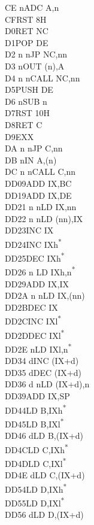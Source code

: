 \documentclass[oneside,a4paper]{book}
\begin{document}
\begin{multicols}{3}
{\begin{tabbing}
CE n\>ADC A,n\\
CF\>RST 8H\\
D0\>RET NC\\
D1\>POP DE\\
D2 n n\>JP NC,nn\\
D3 n\>OUT (n),A\\
D4 n n\>CALL NC,nn\\
D5\>PUSH DE\\
D6 n\>SUB n\\
D7\>RST 10H\\
D8\>RET C\\
D9\>EXX\\
DA n n\>JP C,nn\\
DB n\>IN A,(n)\\
DC n n\>CALL C,nn\\
DD09\>ADD IX,BC\\
DD19\>ADD IX,DE\\
DD21 n n\>LD IX,nn\\
DD22 n n\>LD (nn),IX\\
DD23\>INC IX\\
DD24\>INC IXh\textsuperscript{*}\\
DD25\>DEC IXh\textsuperscript{*}\\
DD26 n \>LD IXh,n\textsuperscript{*}\\
DD29\>ADD IX,IX\\
DD2A n n\>LD IX,(nn)\\
DD2B\>DEC IX\\
DD2C\>INC IXl\textsuperscript{*}\\
DD2D\>DEC IXl\textsuperscript{*}\\
DD2E n\>LD IXl,n\textsuperscript{*}\\
DD34 d\>INC (IX+d)\\
DD35 d\>DEC (IX+d)\\
DD36 d n\>LD (IX+d),n\\
DD39\>ADD IX,SP\\
DD44\>LD B,IXh\textsuperscript{*}\\
DD45\>LD B,IXl\textsuperscript{*}\\
DD46 d\>LD B,(IX+d)\\
DD4C\>LD C,IXh\textsuperscript{*}\\
DD4D\>LD C,IXl\textsuperscript{*}\\
DD4E d\>LD C,(IX+d)\\
DD54\>LD D,IXh\textsuperscript{*}\\
DD55\>LD D,IXl\textsuperscript{*}\\
DD56 d\>LD D,(IX+d)\\

\end{tabbing}}
\end{multicols}
\end{document}
